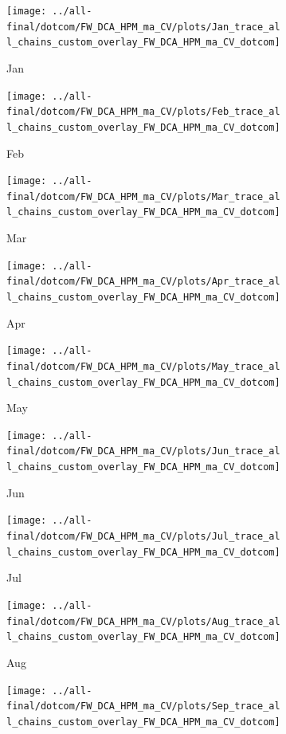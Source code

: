\documentclass[ngerman]{ttlab-qualify}
\begin{document}
\newpage
\begin{figure}[H]
\centering
  \begin{subfigure}{.3\linewidth}
  \texttt{[image: ../all-final/dotcom/FW\_DCA\_HPM\_ma\_CV/plots/Jan\_trace\_all\_chains\_custom\_overlay\_FW\_DCA\_HPM\_ma\_CV\_dotcom]}\hfill
  \caption{Jan}
  \end{subfigure}
  \begin{subfigure}{.3\linewidth}
  \texttt{[image: ../all-final/dotcom/FW\_DCA\_HPM\_ma\_CV/plots/Feb\_trace\_all\_chains\_custom\_overlay\_FW\_DCA\_HPM\_ma\_CV\_dotcom]}\hfill
  \caption{Feb}
  \end{subfigure}
  \begin{subfigure}{.3\linewidth}
  \texttt{[image: ../all-final/dotcom/FW\_DCA\_HPM\_ma\_CV/plots/Mar\_trace\_all\_chains\_custom\_overlay\_FW\_DCA\_HPM\_ma\_CV\_dotcom]}\hfill
  \caption{Mar}
  \end{subfigure}\par\medskip
  \begin{subfigure}{.3\linewidth}
  \texttt{[image: ../all-final/dotcom/FW\_DCA\_HPM\_ma\_CV/plots/Apr\_trace\_all\_chains\_custom\_overlay\_FW\_DCA\_HPM\_ma\_CV\_dotcom]}\hfill
  \caption{Apr}
  \end{subfigure}
  \begin{subfigure}{.3\linewidth}
  \texttt{[image: ../all-final/dotcom/FW\_DCA\_HPM\_ma\_CV/plots/May\_trace\_all\_chains\_custom\_overlay\_FW\_DCA\_HPM\_ma\_CV\_dotcom]}\hfill
  \caption{May}
  \end{subfigure}
  \begin{subfigure}{.3\linewidth}
  \texttt{[image: ../all-final/dotcom/FW\_DCA\_HPM\_ma\_CV/plots/Jun\_trace\_all\_chains\_custom\_overlay\_FW\_DCA\_HPM\_ma\_CV\_dotcom]}\hfill
  \caption{Jun}
  \end{subfigure}\par\medskip
  \begin{subfigure}{.3\linewidth}
  \texttt{[image: ../all-final/dotcom/FW\_DCA\_HPM\_ma\_CV/plots/Jul\_trace\_all\_chains\_custom\_overlay\_FW\_DCA\_HPM\_ma\_CV\_dotcom]}\hfill
  \caption{Jul}
  \end{subfigure}
  \begin{subfigure}{.3\linewidth}
  \texttt{[image: ../all-final/dotcom/FW\_DCA\_HPM\_ma\_CV/plots/Aug\_trace\_all\_chains\_custom\_overlay\_FW\_DCA\_HPM\_ma\_CV\_dotcom]}\hfill
  \caption{Aug}
  \end{subfigure}
  \begin{subfigure}{.3\linewidth}
  \texttt{[image: ../all-final/dotcom/FW\_DCA\_HPM\_ma\_CV/plots/Sep\_trace\_all\_chains\_custom\_overlay\_FW\_DCA\_HPM\_ma\_CV\_dotcom]}\hfill

\end{subfigure}
\end{figure}
\end{document}
